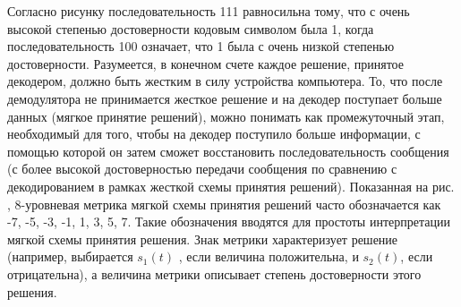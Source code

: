 Согласно рисунку последовательность 111 равносильна тому, что с очень высокой степенью достоверности кодовым символом была 1, когда последовательность 100 означает, что  1 была с очень низкой степенью достоверности. Разумеется, в конечном счете каждое решение, принятое декодером, должно быть жестким в силу устройства компьютера. То, что после демодулятора не принимается жесткое решение и на декодер поступает больше данных (мягкое принятие решений), можно понимать как промежуточный этап, необходимый для того, чтобы на декодер поступило больше информации, с помощью которой он затем сможет восстановить последовательность сообщения (с более высокой достоверностью передачи сообщения по сравнению с декодированием в рамках жесткой схемы принятия решений). Показанная на рис. , 8-уровневая метрика мягкой схемы принятия решений часто обозначается как -7, -5, -3, -1, 1, 3, 5, 7. Такие обозначения вводятся для простоты интерпретации мягкой схемы принятия решения. Знак метрики характеризует решение (например, выбирается  $s_1(t) $ , если величина положительна, и  $s_2(t) $, если отрицательна), а величина метрики описывает степень достоверности этого решения.



